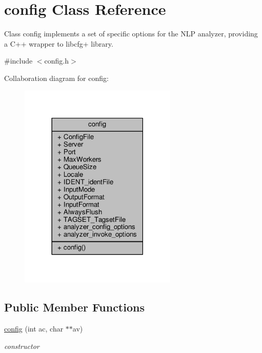 \hypertarget{classconfig}{}\section{config Class Reference}
\label{classconfig}


Class config implements a set of specific options for the N\+L\+P analyzer, providing a C++ wrapper to libcfg+ library.  




{\ttfamily \#include $<$config.\+h$>$}



Collaboration diagram for config\+:\nopagebreak
\begin{figure}[H]
\begin{center}
\leavevmode
\includegraphics[width=213pt]{classconfig__coll__graph}
\end{center}
\end{figure}
\subsection*{Public Member Functions}
\begin{DoxyCompactItemize}
\item 
\hyperlink{classconfig_afe4a0fda7bf097bd04d713c06797e1f1}{config} (int ac, char $\ast$$\ast$av)
\begin{DoxyCompactList}\small\item\em constructor \end{DoxyCompactList}\end{DoxyCompactItemize}
